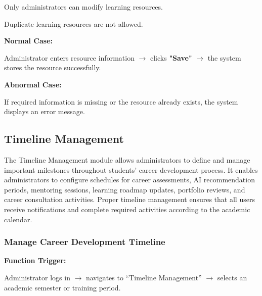 Only administrators can modify learning resources.

Duplicate learning resources are not allowed.

\textbf{Normal Case:}

Administrator enters resource information $\rightarrow$ clicks \textbf{"Save"} $\rightarrow$ the system stores the resource successfully.

\textbf{Abnormal Case:}

If required information is missing or the resource already exists, the system displays an error message.

%

\subsection{Timeline Management}

The Timeline Management module allows administrators to define and manage important milestones throughout students' career development process. It enables administrators to configure schedules for career assessments, AI recommendation periods, mentoring sessions, learning roadmap updates, portfolio reviews, and career consultation activities. Proper timeline management ensures that all users receive notifications and complete required activities according to the academic calendar.

\subsubsection{Manage Career Development Timeline}

\textbf{Function Trigger:}

Administrator logs in $\rightarrow$ navigates to ``Timeline Management'' $\rightarrow$ selects an academic semester or training period.

\vspace{0.3cm}

